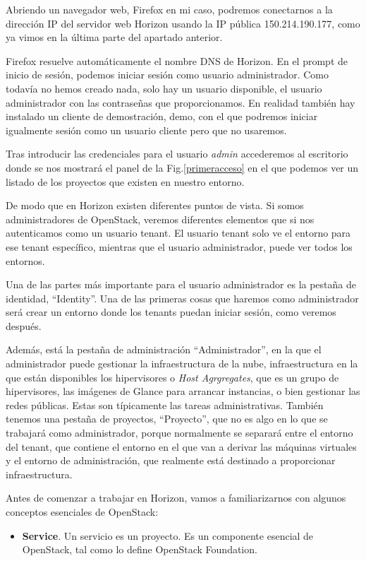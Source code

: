 Abriendo un navegador web, Firefox en mi caso, podremos conectarnos a la dirección IP del servidor web Horizon usando la IP pública 150.214.190.177, como ya vimos en la última parte del apartado anterior. 

Firefox resuelve automáticamente el nombre DNS de Horizon. En el prompt de inicio de sesión, podemos iniciar sesión como usuario administrador. Como todavía no hemos creado nada, solo hay un usuario disponible, el usuario administrador con las contraseñas que proporcionamos. En realidad también hay instalado un cliente de demostración, demo, con el que podremos iniciar igualmente sesión como un usuario cliente pero que no usaremos. 

Tras introducir las credenciales para el usuario \textit{admin} accederemos al escritorio donde se nos mostrará el panel de la Fig.\ref{primeracceso} en el que podemos ver un listado de los proyectos que existen en nuestro entorno.

De modo que en Horizon existen diferentes puntos de vista. Si somos administradores de OpenStack, veremos diferentes elementos que si nos autenticamos como un usuario tenant. El usuario tenant solo ve el entorno para ese tenant específico, mientras que el usuario administrador, puede ver todos los entornos.

Una de las partes más importante para el usuario administrador es la pestaña de identidad, “Identity”. Una de las primeras cosas que haremos como administrador será crear un entorno donde los tenants puedan iniciar sesión, como veremos después.

Además, está la pestaña de administración “Administrador”, en la que el administrador puede gestionar la infraestructura de la nube, infraestructura en la que están disponibles los hipervisores o \textit{Host Agrgregates}, que es un grupo de hipervisores, las imágenes de Glance para arrancar instancias, o bien gestionar las redes públicas. Estas son típicamente las tareas administrativas.  
También tenemos una pestaña de proyectos, “Proyecto”, que no es algo en lo que se trabajará como administrador, porque normalmente se separará entre el entorno del tenant, que contiene el entorno en el que van a derivar las máquinas virtuales y el entorno de administración, que realmente está destinado a proporcionar infraestructura.

Antes de comenzar a trabajar en Horizon, vamos a familiarizarnos con algunos conceptos esenciales de OpenStack:

\begin{itemize}
\item \textbf{Service}. Un servicio es un proyecto. Es un componente esencial de OpenStack, tal como lo define OpenStack Foundation.
\end{itemize}


